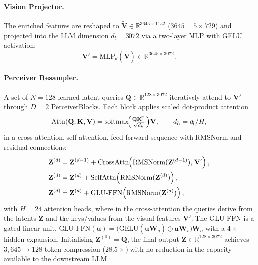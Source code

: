 \documentclass[runningheads]{llncs}
\begin{document}
\paragraph{Vision Projector.}
The enriched features are reshaped to
$\widetilde{\mathbf{V}} \in \mathbb{R}^{3645 \times 1152}$
($3645 = 5 \times 729$) and projected into the LLM dimension $d_l =
3072$ via a two-layer MLP with GELU activation:
\begin{equation}
  \mathbf{V}' = \mathrm{MLP}_\theta(\widetilde{\mathbf{V}})
  \in \mathbb{R}^{3645 \times 3072}.
  \label{eq:projector}
\end{equation}

\paragraph{Perceiver Resampler.}
A set of $N = 128$ learned latent queries
$\mathbf{Q} \in \mathbb{R}^{128 \times 3072}$
iteratively attend to $\mathbf{V}'$ through $D = 2$ PerceiverBlocks.
Each block applies scaled dot-product attention
\begin{equation}
  \mathrm{Attn}(\mathbf{Q},\mathbf{K},\mathbf{V})
    = \mathrm{softmax}\!\Bigl(\tfrac{\mathbf{Q}\mathbf{K}^{\!\top}}{\sqrt{d_h}}\Bigr)\mathbf{V},
    \qquad d_h = d_l / H,
  \label{eq:attn}
\end{equation}
in a cross-attention, self-attention, feed-forward sequence with RMSNorm and residual connections:
\begin{align}
  \mathbf{Z}^{(d)} &= \mathbf{Z}^{(d-1)}
    + \mathrm{CrossAttn}\!\left(\mathrm{RMSNorm}(\mathbf{Z}^{(d-1)}),\,
    \mathbf{V}'\right), \notag\\
  \mathbf{Z}^{(d)} &= \mathbf{Z}^{(d)}
    + \mathrm{SelfAttn}\!\left(\mathrm{RMSNorm}(\mathbf{Z}^{(d)})\right),
    \notag\\
  \mathbf{Z}^{(d)} &= \mathbf{Z}^{(d)}
    + \mathrm{GLU\text{-}FFN}\!\left(\mathrm{RMSNorm}(\mathbf{Z}^{(d)})\right),
  \label{eq:perceiver}
\end{align}
with $H = 24$ attention heads, where in the cross-attention the queries derive from the latents $\mathbf{Z}$ and the keys/values from the visual features $\mathbf{V}'$. The GLU-FFN is a gated linear unit, $\mathrm{GLU\text{-}FFN}(\mathbf{u}) = \bigl(\mathrm{GELU}(\mathbf{u}\mathbf{W}_g)\odot \mathbf{u}\mathbf{W}_v\bigr)\mathbf{W}_o$ with a $4\times$ hidden expansion.
Initialising $\mathbf{Z}^{(0)} = \mathbf{Q}$, the final output
$\mathbf{Z} \in \mathbb{R}^{128 \times 3072}$ achieves $3{,}645 \to 128$
token compression ($28.5\times$) with no reduction in the capacity
available to the downstream LLM.
\end{document}
